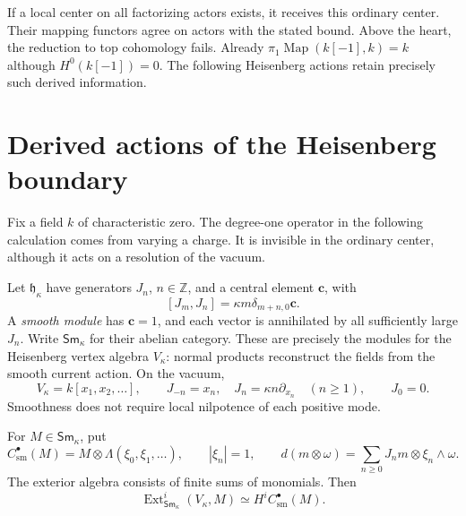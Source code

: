 If a local center on all factorizing actors exists,
it receives this ordinary center. Their mapping functors
agree on actors with the stated bound.
Above the heart,
the reduction to
top cohomology
fails. Already
$\pi_1\operatorname{Map}(k[-1],k)=k$
although
$H^0(k[-1])=0$.
The following
Heisenberg actions
retain precisely
such derived
information.

\section{Derived actions of the Heisenberg boundary}
\label{v4-arith:centers:sec:derived-actions}

Fix a field $k$ of characteristic zero. The degree-one operator
in the following calculation comes from varying a charge. It is
invisible in the ordinary center, although it acts on a resolution
of the vacuum.

Let $\mathfrak h_\kappa$ have generators $J_n$, $n\in\mathbb Z$,
and a central element $\mathbf c$, with
\[
 [J_m,J_n]=\kappa m\delta_{m+n,0}\mathbf c.
\]
A \emph{smooth module} has $\mathbf c=1$, and each vector is
annihilated by all sufficiently large $J_n$. Write
$\mathsf{Sm}_\kappa$ for their abelian category. These are precisely
the modules for the Heisenberg vertex algebra $V_\kappa$:
normal products reconstruct the fields from the smooth current
action. On the vacuum,
\[
 V_\kappa=k[x_1,x_2,\ldots],\qquad
 J_{-n}=x_n,\quad J_n=\kappa n\partial_{x_n}\quad(n\geq1),
 \qquad J_0=0.
\]
Smoothness does not require local nilpotence of each positive mode.

\begin{proposition}
\label{v4-arith:centers:prop:smooth-cochains}
For $M\in\mathsf{Sm}_\kappa$, put
\[
 C^\bullet_{\mathrm{sm}}(M)
 =M\otimes\Lambda(\xi_0,\xi_1,\ldots),\qquad
 |\xi_n|=1,\qquad
 d(m\otimes\omega)=\sum_{n\geq0}J_nm\otimes\xi_n\wedge\omega.
\]
The exterior algebra consists of finite sums of monomials.
Then
\[
 \operatorname{Ext}^i_{\mathsf{Sm}_\kappa}(V_\kappa,M)
 \simeq H^i C^\bullet_{\mathrm{sm}}(M).
\]
\end{proposition}

